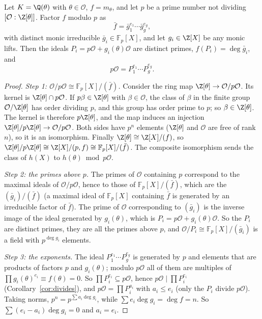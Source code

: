 \begin{theorem}\label{thm:kd}
Let $K=\Q(\theta)$ with $\theta\in\mathcal O$, $f=m_\theta$, and let $p$ be a prime number not dividing
$[\mathcal O:\Z[\theta]]$. Factor $f$ modulo $p$ as
\[
\bar f=\bar g_1^{e_1}\cdots\bar g_g^{e_g},
\]
with distinct monic irreducible $\bar g_i\in\mathbb F_p[X]$, and let $g_i\in\Z[X]$ be any monic lifts. Then the ideals
$P_i=p\mathcal O+g_i(\theta)\mathcal O$ are distinct primes, $f(P_i)=\deg\bar g_i$, and
\[
p\mathcal O=P_1^{e_1}\cdots P_g^{e_g}.
\]
\end{theorem}
\begin{proof}
\emph{Step 1: $\mathcal O/p\mathcal O\cong\mathbb F_p[X]/(\bar f)$.} Consider the ring map $\Z[\theta]\to\mathcal O/p
\mathcal O$. Its kernel is $\Z[\theta]\cap p\mathcal O$. If $p\beta\in\Z[\theta]$ with $\beta\in\mathcal O$, the class
of $\beta$ in the finite group $\mathcal O/\Z[\theta]$ has order dividing $p$, and this group has order prime to $p$; so
$\beta\in\Z[\theta]$. The kernel is therefore $p\Z[\theta]$, and the map induces an injection $\Z[\theta]/p\Z[\theta]\to
\mathcal O/p\mathcal O$. Both sides have $p^n$ elements ($\Z[\theta]$ and $\mathcal O$ are free of rank $n$), so it is an
isomorphism. Finally $\Z[\theta]\cong\Z[X]/(f)$, so $\Z[\theta]/p\Z[\theta]\cong\Z[X]/(p,f)\cong\mathbb F_p[X]/(\bar f)$.
The composite isomorphism sends the class of $h(X)$ to $h(\theta)\bmod p\mathcal O$.

\emph{Step 2: the primes above $p$.} The primes of $\mathcal O$ containing $p$ correspond to the maximal ideals of
$\mathcal O/p\mathcal O$, hence to those of $\mathbb F_p[X]/(\bar f)$, which are the $(\bar g_i)/(\bar f)$ (a maximal
ideal of $\mathbb F_p[X]$ containing $\bar f$ is generated by an irreducible factor of $\bar f$). The prime of
$\mathcal O$ corresponding to $(\bar g_i)$ is the inverse image of the ideal generated by $g_i(\theta)$, which is
$P_i=p\mathcal O+g_i(\theta)\mathcal O$. So the $P_i$ are distinct primes, they are all the primes above $p$, and
$\mathcal O/P_i\cong\mathbb F_p[X]/(\bar g_i)$ is a field with $p^{\deg g_i}$ elements.

\emph{Step 3: the exponents.} The ideal $P_1^{e_1}\cdots P_g^{e_g}$ is generated by $p$ and elements that are products of
factors $p$ and $g_i(\theta)$; modulo $p\mathcal O$ all of them are multiples of $\prod g_i(\theta)^{e_i}\equiv
f(\theta)=0$. So $\prod P_i^{e_i}\subseteq p\mathcal O$, hence $p\mathcal O\mid\prod P_i^{e_i}$
(Corollary~\ref{cor:divides}), and $p\mathcal O=\prod P_i^{a_i}$ with $a_i\le e_i$ (only the $P_i$ divide $p\mathcal O$).
Taking norms, $p^n=p^{\sum a_i\deg g_i}$, while $\sum e_i\deg g_i=\deg f=n$. So $\sum(e_i-a_i)\deg g_i=0$ and $a_i=e_i$.
\end{proof}

